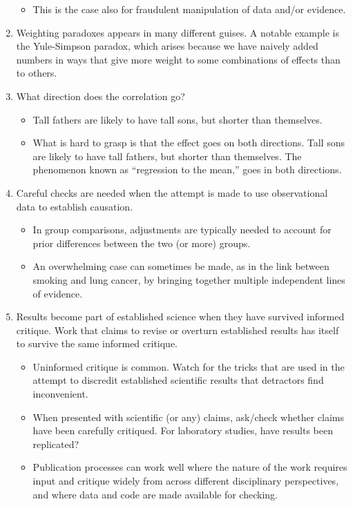 \documentclass[
  10pt,
  b5paper]{book}
\providecommand{\tightlist}{%
  \setlength{\itemsep}{0pt}\setlength{\parskip}{0pt}}
\begin{document}
\begin{enumerate}
  \begin{itemize}
  \tightlist
  \item
    This is the case also for fraudulent manipulation of
    data and/or evidence.
  \end{itemize}
\item
  Weighting paradoxes appears in many different guises.
  A notable example is the Yule-Simpson paradox, which arises
  because we have naively added numbers in ways that give more
  weight to some combinations of effects than to others.
\item
  What direction does the correlation go?

  \begin{itemize}
  \tightlist
  \item
    Tall fathers are likely to have tall sons, but shorter than themselves.
  \item
    What is hard to grasp is that the effect goes on both directions.
    Tall sons are likely to have tall fathers, but shorter than themselves.
    The phenomenon known as ``regression to the mean,''
    goes in both directions.
  \end{itemize}
\item
  Careful checks are needed when the attempt is made to use
  observational data to establish causation.

  \begin{itemize}
  \tightlist
  \item
    In group comparisons, adjustments are typically needed
    to account for prior differences between the two (or more)
    groups.
  \item
    An overwhelming case can sometimes be made, as in the link
    between smoking and lung cancer, by bringing together multiple
    independent lines of evidence.
  \end{itemize}
\item
  Results become part of established science when they have
  survived informed critique. Work that claims to revise or overturn
  established results has itself to survive the same informed critique.

  \begin{itemize}
  \tightlist
  \item
    Uninformed critique is common. Watch for the
    tricks that are used in the attempt to discredit established
    scientific results that detractors find inconvenient.
  \item
    When presented with scientific (or any) claims, ask/check
    whether claims have been carefully critiqued. For laboratory
    studies, have results been replicated?
  \item
    Publication processes can work well where the nature of the
    work requires input and critique widely from across different
    disciplinary perspectives, and where data and code are made
    available for checking.
  \end{itemize}
\end{enumerate}
\end{document}
